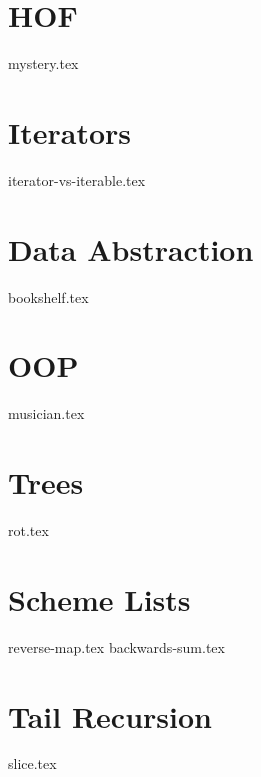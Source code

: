 \documentclass{exam}
\begin{document}
\section{HOF}
\begin{questions}
{mystery.tex}
\end{questions}

\section{Iterators}
\begin{questions}
{iterator-vs-iterable.tex}
\end{questions}

\section{Data Abstraction}
\begin{questions}
{bookshelf.tex}
\end{questions}

\section{OOP}
\begin{questions}
{musician.tex}
\end{questions}

\section{Trees}
\begin{questions}
{rot.tex}
\end{questions}

\section{Scheme Lists}
\begin{questions}
{reverse-map.tex}
{backwards-sum.tex}
\end{questions}

\section{Tail Recursion}
\begin{questions}
{slice.tex}
\end{questions}
\end{document}
